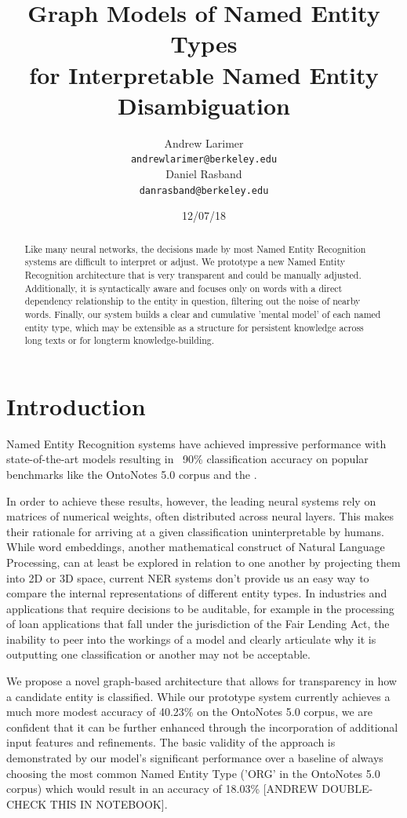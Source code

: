 \documentclass[11pt,a4paper]{article}
\title{Graph Models of Named Entity Types\\for Interpretable Named Entity Disambiguation}
\author{Andrew Larimer \\
  {\tt andrewlarimer@berkeley.edu} \\\And
  Daniel Rasband \\
  {\tt danrasband@berkeley.edu} \\}
\date{12/07/18}
\begin{document}
\maketitle
\begin{abstract}
Like many neural networks, the decisions made by most Named Entity Recognition systems are difficult to interpret or adjust. We prototype a new Named Entity Recognition architecture that is very transparent and could be manually adjusted. Additionally, it is syntactically aware and focuses only on words with a direct dependency relationship to the entity in question, filtering out the noise of nearby words. Finally, our system builds a clear and cumulative 'mental model' of each named entity type, which may be extensible as a structure for persistent knowledge across long texts or for longterm knowledge-building.
\end{abstract}

\section{Introduction}
Named Entity Recognition systems have achieved impressive performance with state-of-the-art models resulting in ~90\% classification accuracy on popular benchmarks like the OntoNotes 5.0 corpus and the .

In order to achieve these results, however, the leading neural systems rely on matrices of numerical weights, often distributed across neural layers. This makes their rationale for arriving at a given classification uninterpretable by humans. While word embeddings, another mathematical construct of Natural Language Processing, can at least be explored in relation to one another by projecting them into 2D or 3D space, current NER systems don't provide us an easy way to compare the internal representations of different entity types.  In industries and applications that require decisions to be auditable, for example in the processing of loan applications that fall under the jurisdiction of the Fair Lending Act, the inability to peer into the workings of a model and clearly articulate why it is outputting one classification or another may not be acceptable.

We propose a novel graph-based architecture that allows for transparency in how a candidate entity is classified. While our prototype system currently achieves a much more modest accuracy of 40.23\% on the OntoNotes 5.0 corpus, we are confident that it can be further enhanced through the incorporation of additional input features and refinements. The basic validity of the approach is demonstrated by our model's significant performance over a baseline of always choosing the most common Named Entity Type ('ORG' in the OntoNotes 5.0 corpus) which would result in an accuracy of 18.03\% [ANDREW DOUBLE-CHECK THIS IN NOTEBOOK].
\end{document}
